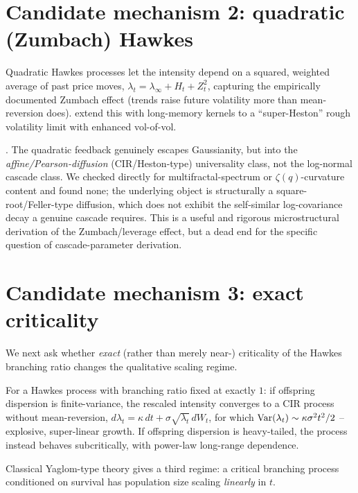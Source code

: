\documentclass[11pt]{article}
\begin{document}
\section{Candidate mechanism 2: quadratic (Zumbach) Hawkes}

Quadratic Hawkes processes \citep{blanc2017quadratic} let the intensity depend on a squared, weighted average of past price moves, $\lambda_t=\lambda_\infty+H_t+Z_t^2$, capturing the empirically documented Zumbach effect (trends raise future volatility more than mean-reversion does). \citet{dandapani2021superheston} extend this with long-memory kernels to a ``super-Heston'' rough volatility limit with enhanced vol-of-vol.

\begin{finding}
. The quadratic feedback genuinely escapes Gaussianity, but into the \emph{affine/Pearson-diffusion} (CIR/Heston-type) universality class, not the log-normal cascade class. We checked \citet{dandapani2021superheston} directly for multifractal-spectrum or $\zeta(q)$-curvature content and found none; the underlying object is structurally a square-root/Feller-type diffusion, which does not exhibit the self-similar log-covariance decay a genuine cascade requires. This is a useful and rigorous microstructural derivation of the Zumbach/leverage effect, but a dead end for the specific question of cascade-parameter derivation.
\end{finding}

\section{Candidate mechanism 3: exact criticality}

We next ask whether \emph{exact} (rather than merely near-) criticality of the Hawkes branching ratio changes the qualitative scaling regime.

\begin{proposition}
For a Hawkes process with branching ratio fixed at exactly $1$: if offspring dispersion is finite-variance, the rescaled intensity converges to a CIR process without mean-reversion, $d\lambda_t = \kappa\,dt + \sigma\sqrt{\lambda_t}\,dW_t$, for which $\operatorname{Var}(\lambda_t)\sim \kappa\sigma^2 t^2/2$ -- explosive, super-linear growth. If offspring dispersion is heavy-tailed, the process instead behaves subcritically, with power-law long-range dependence.
\end{proposition}

Classical Yaglom-type theory \citep{yaglom1947} gives a third regime: a critical branching process conditioned on survival has population size scaling \emph{linearly} in $t$.
\end{document}
